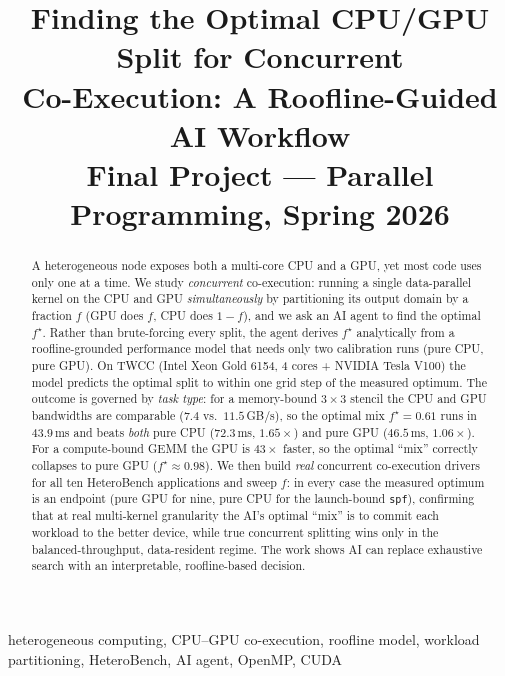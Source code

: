 \documentclass[conference]{IEEEtran}
\begin{document}
\title{Finding the Optimal CPU/GPU Split for Concurrent\\ Co-Execution: A Roofline-Guided AI Workflow\\
{\footnotesize Final Project --- Parallel Programming, Spring 2026}}

\author{%
%
}

\maketitle

\begin{abstract}
A heterogeneous node exposes both a multi-core CPU and a GPU, yet most code uses
only one at a time. We study \emph{concurrent} co-execution: running a single
data-parallel kernel on the CPU and GPU \emph{simultaneously} by partitioning its
output domain by a fraction $f$ (GPU does $f$, CPU does $1{-}f$), and we ask an AI
agent to find the optimal $f^\star$. Rather than brute-forcing every split, the
agent derives $f^\star$ analytically from a roofline-grounded performance model that
needs only two calibration runs (pure CPU, pure GPU). On TWCC (Intel Xeon Gold 6154,
4 cores + NVIDIA Tesla V100) the model predicts the optimal split to within one grid
step of the measured optimum. The outcome is governed by \emph{task type}: for a
memory-bound $3{\times}3$ stencil the CPU and GPU bandwidths are comparable
($7.4$ vs.\ $11.5$\,GB/s), so the optimal mix $f^\star{=}0.61$ runs in $43.9$\,ms and
beats \emph{both} pure CPU ($72.3$\,ms, $1.65\times$) and pure GPU
($46.5$\,ms, $1.06\times$). For a compute-bound GEMM the GPU is $43\times$ faster, so
the optimal ``mix'' correctly collapses to pure GPU ($f^\star{\approx}0.98$). We then
build \emph{real} concurrent co-execution drivers for all ten HeteroBench applications and
sweep $f$: in every case the measured optimum is an endpoint (pure GPU for nine, pure CPU
for the launch-bound \texttt{spf}), confirming that at real multi-kernel granularity the
AI's optimal ``mix'' is to commit each workload to the better device, while true
concurrent splitting wins only in the balanced-throughput, data-resident regime. The work
shows AI can replace exhaustive search with an interpretable, roofline-based decision.
\end{abstract}

\begin{IEEEkeywords}
heterogeneous computing, CPU--GPU co-execution, roofline model, workload
partitioning, HeteroBench, AI agent, OpenMP, CUDA
\end{IEEEkeywords}
\end{document}
